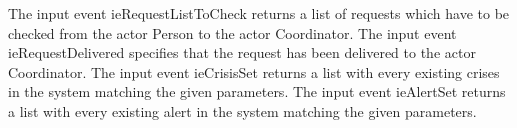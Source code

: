 \begin{actortable}
							 {The input event ieRequestListToCheck returns a list of requests which have to be checked from the 
							 actor Person to the actor Coordinator.}
							 {The input event ieRequestDelivered specifies that the request has been delivered to the actor 
							 Coordinator.}
							 {The input event ieCrisisSet returns a list with every existing crises in the system matching the given parameters.}
							 {The input event ieAlertSet returns a list with every existing alert in the system matching the given parameters.}
	
\end{actortable}
